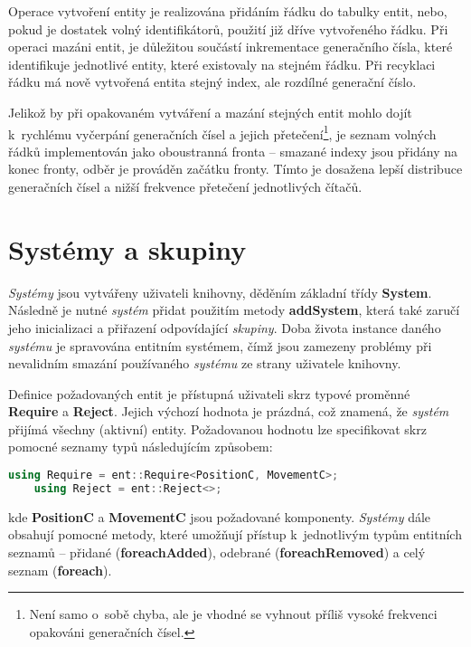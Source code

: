 Operace vytvoření entity je realizována přidáním řádku do tabulky entit, nebo, pokud je dostatek volný identifikátorů, použití již dříve vytvořeného řádku. Při operaci mazáni entit, je důležitou součástí inkrementace generačního čísla, které identifikuje jednotlivé entity, které existovaly na stejném řádku. Při recyklaci řádku má nově vytvořená entita stejný index, ale rozdílné generační číslo. 

Jelikož by při opakovaném vytváření a mazání stejných entit mohlo dojít k~rychlému vyčerpání generačních čísel a jejich přetečení\footnote{Není samo o~sobě chyba, ale je vhodné se vyhnout příliš vysoké frekvenci opakováni generačních čísel.}, je seznam volných řádků implementován jako oboustranná fronta -- smazané indexy jsou přidány na konec fronty, odběr je prováděn začátku fronty. Tímto je dosažena lepší distribuce generačních čísel a nižší frekvence přetečení jednotlivých čítačů.

\section{Systémy a skupiny}
\label{Chap:ImplSystem}

\emph{Systémy} jsou vytvářeny uživateli knihovny, děděním základní třídy \textbf{System}. Následně je nutné \emph{systém} přidat použitím metody \textbf{addSystem}, která také zaručí jeho inicializaci a přiřazení odpovídající \emph{skupiny}. Doba života instance daného \emph{systému} je spravována entitním systémem, čímž jsou zamezeny problémy při nevalidním smazání používaného \emph{systému} ze strany uživatele knihovny.

Definice požadovaných entit je přístupná uživateli skrz typové proměnné \textbf{Require} a \textbf{Reject}. Jejich výchozí hodnota je prázdná, což znamená, že \emph{systém} přijímá všechny (aktivní) entity. Požadovanou hodnotu lze specifikovat skrz pomocné seznamy typů následujícím způsobem: 

\begin{lstlisting}[language=C++]
	using Require = ent::Require<PositionC, MovementC>;
	using Reject = ent::Reject<>;
\end{lstlisting}

\noindent kde \textbf{PositionC} a \textbf{MovementC} jsou požadované komponenty. \emph{Systémy} dále obsahují pomocné metody, které umožňují přístup k~jednotlivým typům entitních seznamů -- přidané (\textbf{foreachAdded}), odebrané (\textbf{foreachRemoved}) a celý seznam (\textbf{foreach}).

